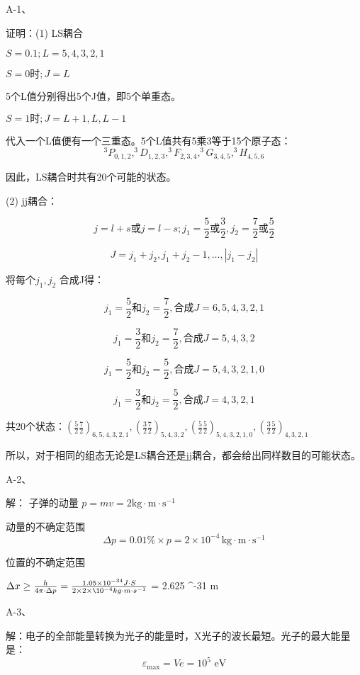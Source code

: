 \documentclass{article}
\begin{document}
\begin{CJK*}{UTF8}{gbsn}


A-1、

证明：(1) LS耦合

\( S = 0.1; L = 5,4,3,2,1 \)

\( S = 0时; J = L \)

5个L值分别得出5个J值，即5个单重态。

\( S = 1时; J = L+1, L, L-1 \)

代入一个L值便有一个三重态。5个L值共有5乘3等于15个原子态：
\[
^3P_{0,1,2}, ^3D_{1,2,3}, ^3F_{2,3,4}, ^3G_{3,4,5}, ^3H_{4,5,6}
\]

因此，LS耦合时共有20个可能的状态。

(2) jj耦合：

\[
j = l + s或j = l - s; j_1 = \frac{5}{2}或\frac{3}{2}, j_2 = \frac{7}{2}或\frac{5}{2}
\]

\[
J = j_1 + j_2, j_1 + j_2 - 1, \ldots, |j_1 - j_2|
\]

将每个\(j_1, j_2\) 合成J得：

\[
j_1 = \frac{5}{2} 和 j_2 = \frac{7}{2}, 合成J = 6, 5, 4, 3, 2, 1
\]

\[
j_1 = \frac{3}{2} 和 j_2 = \frac{7}{2}, 合成J = 5, 4, 3, 2
\]

\[
j_1 = \frac{5}{2} 和 j_2 = \frac{5}{2}, 合成J = 5, 4, 3, 2, 1, 0
\]

\[
j_1 = \frac{3}{2} 和 j_2 = \frac{5}{2}, 合成J = 4, 3, 2, 1
\]

共20个状态：\((\frac{5}{2} \frac{7}{2})_{6, 5, 4, 3, 2, 1}, (\frac{3}{2} \frac{7}{2})_{5, 4, 3, 2}, (\frac{5}{2} \frac{5}{2})_{5, 4, 3, 2, 1, 0}, (\frac{3}{2} \frac{5}{2})_{4, 3, 2, 1}\)

所以，对于相同的组态无论是LS耦合还是jj耦合，都会给出同样数目的可能状态。

A-2、

解：
子弹的动量 $p = mv = 2
\mathrm{kg}\cdot\mathrm{m}\cdot\mathrm{s}^{-1}$


动量的不确定范围
$$\Delta p = 0.01\% \times p = 2 \times 10^{-4}\, \mathrm{kg}\cdot\mathrm{m}\cdot\mathrm{s}^{-1}$$

位置的不确定范围

$\Delta x \geq  \frac{h}{4\pi \cdot \Delta p} = \frac{1.05 \times 10^{-34} J \cdot S }{2\times 2 \times \10^{-4} kg \cdot m \cdot s^{-1}}$
= 2.625 ^{-31} m  

A-3、

解：电子的全部能量转换为光子的能量时，X光子的波长最短。光子的最大能量是：
\[
\varepsilon_{\max} = Ve = 10^5 \text{ eV}
\]


\end{CJK*}
\end{document}

